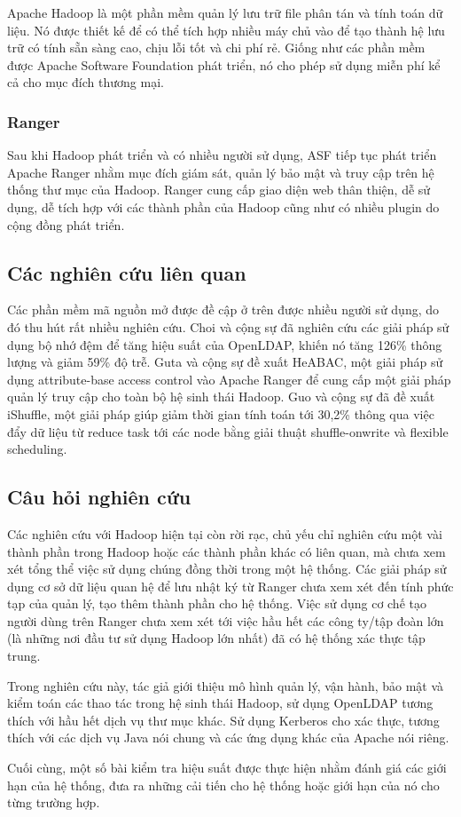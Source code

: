 Apache Hadoop là một phần mềm quản lý lưu trữ file phân tán và tính toán dữ liệu. Nó được thiết kế để có thể tích hợp nhiều máy chủ vào để tạo thành hệ lưu trữ có tính sẵn sàng cao, chịu lỗi tốt và chi phí rẻ. Giống như các phần mềm được Apache Software Foundation phát triển, nó cho phép sử dụng miễn phí kể cả cho mục đích thương mại. 

\subsubsection{Ranger}

Sau khi Hadoop phát triển và có nhiều người sử dụng, ASF tiếp tục phát triển Apache Ranger nhằm mục đích giám sát, quản lý bảo mật và truy cập trên hệ thống thư mục của Hadoop. Ranger cung cấp giao diện web thân thiện, dễ sử dụng, dễ tích hợp với các thành phần của Hadoop cũng như có nhiều plugin do cộng đồng phát triển.

\subsection{Các nghiên cứu liên quan}

Các phần mềm mã nguồn mở được đề cập ở trên được nhiều người sử dụng, do đó thu hút rất nhiều nghiên cứu. Choi và cộng sự \cite{choi2003enhancing} đã nghiên cứu các giải pháp sử dụng bộ nhớ đệm để tăng hiệu suất của OpenLDAP, khiến nó tăng 126\% thông lượng và giảm 59\% độ trễ. Guta và cộng sự \cite{gupta2018attribute} đề xuất HeABAC, một giải pháp sử dụng attribute-base access control vào Apache Ranger để cung cấp một giải pháp quản lý truy cập cho toàn bộ hệ sinh thái Hadoop. Guo và cộng sự \cite{guo2016ishuffle} đã đề xuất iShuffle, một giải pháp giúp giảm thời gian tính toán tới 30,2\% thông qua việc đẩy dữ liệu từ reduce task tới các node bằng giải thuật shuffle-onwrite và  flexible scheduling.

\subsection{Câu hỏi nghiên cứu}

Các nghiên cứu với Hadoop hiện tại còn rời rạc, chủ yếu chỉ nghiên cứu một vài thành phần trong Hadoop hoặc các thành phần khác có liên quan, mà chưa xem xét tổng thể việc sử dụng chúng đồng thời trong một hệ thống. Các giải pháp sử dụng cơ sở dữ liệu quan hệ để lưu nhật ký từ Ranger chưa xem xét đến tính phức tạp của quản lý, tạo thêm thành phần cho hệ thống. Việc sử dụng cơ chế tạo người dùng trên Ranger chưa xem xét tới việc hầu hết các công ty/tập đoàn lớn (là những nơi đầu tư sử dụng Hadoop lớn nhất) đã có hệ thống xác thực tập trung.

Trong nghiên cứu này, tác giả giới thiệu mô hình quản lý, vận hành, bảo mật và kiểm toán các thao tác trong hệ sinh thái Hadoop, sử dụng OpenLDAP tương thích với hầu hết dịch vụ thư mục khác. Sử dụng Kerberos cho xác thực, tương thích với các dịch vụ Java nói chung và các ứng dụng khác của Apache nói riêng.

Cuối cùng, một số bài kiểm tra hiệu suất được thực hiện nhằm đánh giá các giới hạn của hệ thống, đưa ra những cải tiến cho hệ thống hoặc giới hạn của nó cho từng trường hợp.
